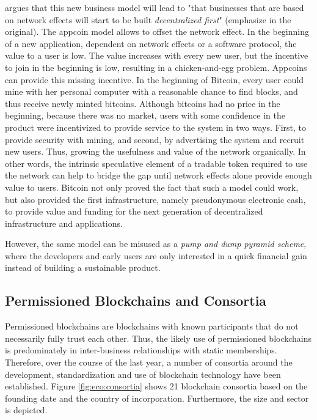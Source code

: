 \cite{Ehrsam2016} argues that this new business model will lead to "that businesses that are based on network effects will start to be built \emph{decentralized first}" (emphasize in the original). The appcoin model allows to offset the network effect. In the beginning of a new application, dependent on network effects or a software protocol, the value to a user is low. The value increases with every new user, but the incentive to join in the beginning is low, resulting in a chicken-and-egg problem. Appcoins can provide this missing incentive. In the beginning of Bitcoin, every user could mine with her personal computer with a reasonable chance to find blocks, and thus receive newly minted bitcoins. Although bitcoins had no price in the beginning, because there was no market, users with some confidence in the product were incentivized to provide service to the system in two ways. First, to provide security with mining, and second, by advertising the system and recruit new users. Thus, growing the usefulness and value of the network organically. In other words, the intrinsic speculative element of a tradable token required to use the network can help to bridge the gap until network effects alone provide enough value to users. Bitcoin not only proved the fact that such a model could work, but also provided the first infrastructure, namely pseudonymous electronic cash, to provide value and funding for the next generation of decentralized infrastructure and applications. 

However, the same model can be misused as a \emph{pump and dump pyramid scheme}, where the developers and early users are only interested in a quick financial gain instead of building a sustainable product. 


\subsection{Permissioned Blockchains and Consortia}
\label{sec:eco:consortia}

Permissioned blockchains are blockchains with known participants that do not necessarily fully trust each other. Thus, the likely use of permissioned blockchains is predominately in inter-business relationships with static memberships. Therefore, over the course of the last year, a number of consortia around the development, standardization and use of blockchain technology have been established. Figure \ref{fig:eco:consortia} shows 21 blockchain consortia based on the founding date and the country of incorporation. Furthermore, the size and sector is depicted. 

